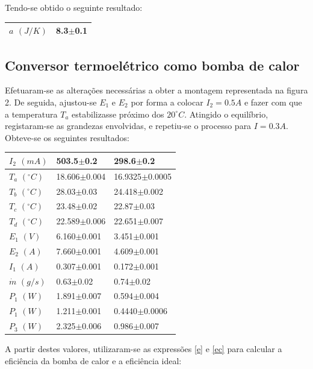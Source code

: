 \documentclass[9pt]{extarticle}
\begin{document}
\begin{multicols}{2}
\par Tendo-se obtido o seguinte resultado:

\begin{center}
\begin{tabular}{ x{2cm} x{2cm} }
\hline \hline
$a$ $(J/K)$ & 8.3$\pm$0.1 \tabularnewline
\hline \hline
\end{tabular}
\end{center}

\subsection*{Conversor termoelétrico como bomba de calor}

\par Efetuaram-se as alterações necessárias a obter a montagem representada na figura 2. De seguida, ajustou-se $E_1$ e $E_2$ por forma a colocar $I_2=0.5A$ e fazer com que a temperatura $T_a$ estabilizasse próximo dos $20^\circ C$. Atingido o equilíbrio, registaram-se as grandezas envolvidas, e repetiu-se o processo para $I=0.3A$. Obteve-se os seguintes resultados:

{\small
\begin{center}
\begin{tabular}{ x{1.5cm} x{2.2cm} x{2.2cm} }
$I_2$ $(mA)$ & 503.5$\pm$0.2 & 298.6$\pm$0.2 \tabularnewline
\hline \hline
$T_a$ $(^\circ C)$ & 18.606$\pm$0.004 & 16.9325$\pm$0.0005 \tabularnewline
$T_b$ $(^\circ C)$ & 28.03$\pm$0.03 & 24.418$\pm$0.002 \tabularnewline
$T_c$ $(^\circ C)$ & 23.48$\pm$0.02 & 22.87$\pm$0.03 \tabularnewline
$T_d$ $(^\circ C)$ & 22.589$\pm$0.006 & 22.651$\pm$0.007 \tabularnewline
$E_1$ $(V)$ & 6.160$\pm$0.001 & 3.451$\pm$0.001 \tabularnewline
$E_2$ $(A)$ & 7.660$\pm$0.001 & 4.609$\pm$0.001 \tabularnewline
$I_1$ $(A)$ & 0.307$\pm$0.001 & 0.172$\pm$0.001 \tabularnewline
$\dot{m}$ $(g/s)$ & 0.63$\pm$0.02 & 0.74$\pm$0.02 \tabularnewline
$P_1$ $(W)$ & 1.891$\pm$0.007 & 0.594$\pm$0.004 \tabularnewline
$P_1$ $(W)$ & 1.211$\pm$0.001 & 0.4440$\pm$0.0006 \tabularnewline
$P_3$ $(W)$ & 2.325$\pm$0.006 & 0.986$\pm$0.007 \tabularnewline
\end{tabular}
\par{}
\end{center}
}

\par A partir destes valores, utilizaram-se as expressões \eqref{e} e \eqref{ec} para calcular a eficiência da bomba de calor e a eficiência ideal:


\end{multicols}
\end{document}
